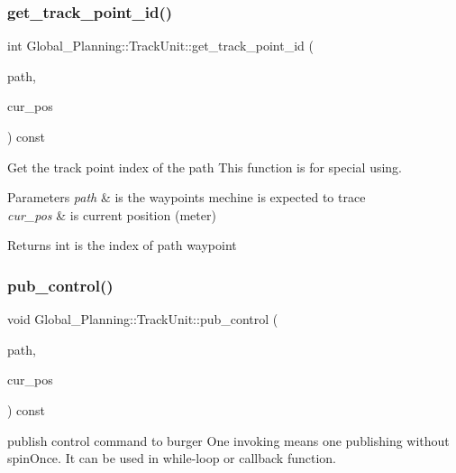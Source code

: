 \subsubsection{\texorpdfstring{get\+\_\+track\+\_\+point\+\_\+id()}{get\_track\_point\_id()}}
{\footnotesize\ttfamily int Global\+\_\+\+Planning\+::\+Track\+Unit\+::get\+\_\+track\+\_\+point\+\_\+id (\begin{DoxyParamCaption}\item[{const nav\+\_\+msgs\+::\+Path \&}]{path,  }\item[{const geometry\+\_\+msgs\+::\+Pose \&}]{cur\+\_\+pos }\end{DoxyParamCaption}) const}



Get the track point index of the path This function is for special using. 


\begin{DoxyParams}{Parameters}
{\em path} & is the waypoints mechine is expected to trace \\
\hline
{\em cur\+\_\+pos} & is current position (meter) \\
\hline
\end{DoxyParams}
\begin{DoxyReturn}{Returns}
int is the index of path waypoint 
\end{DoxyReturn}
\mbox{\label{class_global___planning_1_1_track_unit_ae78e6a634662dce0f8c48a0caba8a38d}} 
\subsubsection{\texorpdfstring{pub\+\_\+control()}{pub\_control()}}
{\footnotesize\ttfamily void Global\+\_\+\+Planning\+::\+Track\+Unit\+::pub\+\_\+control (\begin{DoxyParamCaption}\item[{const nav\+\_\+msgs\+::\+Path \&}]{path,  }\item[{const geometry\+\_\+msgs\+::\+Pose \&}]{cur\+\_\+pos }\end{DoxyParamCaption}) const}



publish control command to burger One invoking means one publishing without spin\+Once. It can be used in while-\/loop or callback function. 


